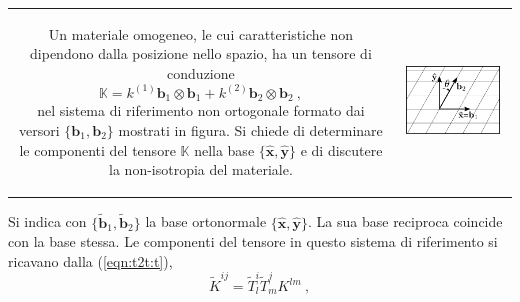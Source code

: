 \begin{tabular}{cc}
\begin{minipage}{0.60\textwidth}
\begin{exercise}
 Un materiale omogeneo, le cui caratteristiche non dipendono dalla posizione nello spazio, ha un tensore di conduzione
\begin{equation}
    \mathbb{K} = k^{(1)} \bm{b}_1 \otimes \bm{b}_1 + 
                 k^{(2)} \bm{b}_2 \otimes \bm{b}_2 \ ,
\end{equation}
    nel sistema di riferimento non ortogonale formato dai versori $\{ \bm{b}_1, \bm{b}_2 \}$ mostrati in figura. Si chiede di determinare le componenti del tensore $\mathbb{K}$ nella base $\{ \bm{\hat{x}}, \bm{\hat{y}} \}$ e di discutere la non-isotropia del materiale.
\end{exercise}
\end{minipage}
&
\begin{minipage}{0.35\textwidth} 
   \begin{center}
       \includegraphics[width=0.90\textwidth]{./fig/conductionComposite}
   \end{center}
\end{minipage}
\end{tabular}
\vspace{10pt} \newline \noindent
Si indica con $\{\bm{\tilde{b}}_1 , \bm{\tilde{b}}_2 \}$ la base ortonormale $\{ \bm{\hat{x}}, \bm{\hat{y}} \}$. La sua base reciproca coincide con la base stessa.
Le componenti del tensore in questo sistema di riferimento si ricavano dalla (\ref{eqn:t2t:t}),
\begin{equation}
 \tilde{K}^{ij} = \tilde{T}^{i}_{l} \tilde{T}^j_m K^{lm} \ ,
\end{equation}

